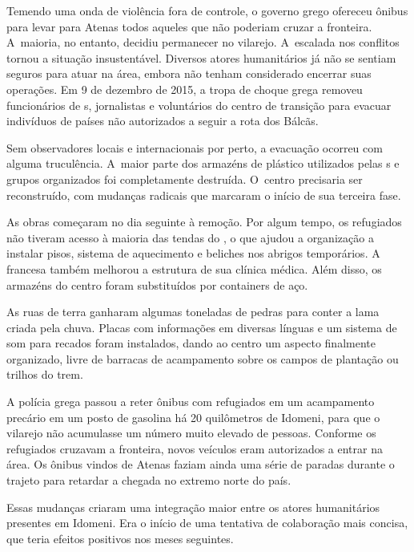 Temendo uma onda de violência fora de controle, o governo grego ofereceu
ônibus para levar para Atenas todos aqueles que não poderiam cruzar a
fronteira. A~maioria, no entanto, decidiu permanecer no vilarejo. A~escalada nos conflitos tornou a situação insustentável. Diversos atores
humanitários já não se sentiam seguros para atuar na área, embora não
tenham considerado encerrar suas operações. Em 9 de dezembro de 2015, a
tropa de choque grega removeu funcionários de s, jornalistas e
voluntários do centro de transição para evacuar indivíduos de países não
autorizados a seguir a rota dos Bálcãs.

Sem observadores locais e internacionais por perto, a evacuação ocorreu
com alguma truculência. A~maior parte dos armazéns de plástico
utilizados pelas s e grupos organizados foi completamente destruída.
O~centro precisaria ser reconstruído, com mudanças radicais que marcaram
o início de sua terceira fase.

As obras começaram no dia seguinte à remoção. Por algum tempo, os
refugiados não tiveram acesso à maioria das tendas do , o que
ajudou a organização a instalar pisos, sistema de aquecimento e beliches nos
abrigos temporários. A~ francesa também melhorou a estrutura de sua
clínica médica. Além disso, os armazéns do centro foram substituídos por
containers de aço.

As ruas de terra ganharam algumas toneladas de pedras para conter a lama
criada pela chuva. Placas com informações em diversas línguas e um
sistema de som para recados foram instalados, dando ao centro um aspecto
finalmente organizado, livre de barracas de acampamento sobre os campos de
plantação ou trilhos do trem.

A polícia grega passou a reter ônibus com refugiados em um acampamento
precário em um posto de gasolina há 20 quilômetros de Idomeni, para que
o vilarejo não acumulasse um número muito elevado de pessoas. Conforme
os refugiados cruzavam a fronteira, novos veículos eram autorizados a
entrar na área. Os ônibus vindos de Atenas faziam ainda uma série de
paradas durante o trajeto para retardar a chegada no extremo norte do
país.

Essas mudanças criaram uma integração maior entre os atores humanitários
presentes em Idomeni. Era o início de uma tentativa de colaboração mais
concisa, que teria efeitos positivos nos meses seguintes.

